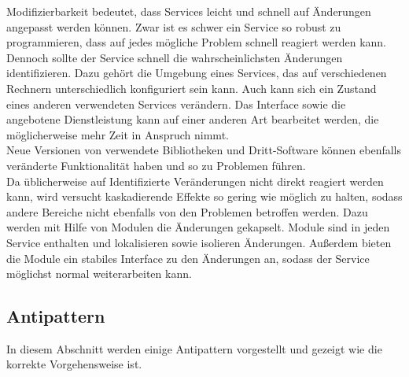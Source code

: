 Modifizierbarkeit bedeutet, dass Services leicht und schnell auf Änderungen angepasst werden können. Zwar ist es schwer ein Service so robust zu programmieren, dass auf jedes mögliche Problem schnell reagiert werden kann. Dennoch sollte der Service schnell die wahrscheinlichsten Änderungen identifizieren. Dazu gehört die Umgebung eines Services, das auf verschiedenen Rechnern unterschiedlich konfiguriert sein kann. Auch kann sich ein Zustand eines anderen verwendeten Services verändern. Das Interface sowie die angebotene Dienstleistung kann auf einer anderen Art bearbeitet werden, die möglicherweise mehr Zeit in Anspruch nimmt.\\
Neue Versionen von verwendete Bibliotheken und Dritt-Software können ebenfalls veränderte Funktionalität haben und so zu Problemen führen.\\
Da üblicherweise auf Identifizierte Veränderungen nicht direkt reagiert werden kann, wird versucht kaskadierende Effekte so gering wie möglich zu halten, sodass andere Bereiche nicht ebenfalls von den Problemen betroffen werden. Dazu werden mit Hilfe von Modulen die Änderungen gekapselt. Module sind in jeden Service enthalten und lokalisieren sowie isolieren Änderungen. Außerdem bieten die Module ein stabiles Interface zu den Änderungen an, sodass der Service möglichst normal weiterarbeiten kann. 

\subsection{Antipattern}

In diesem Abschnitt werden einige Antipattern vorgestellt und gezeigt wie die korrekte Vorgehensweise ist.

